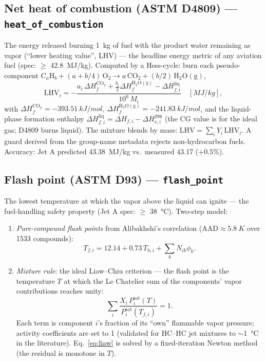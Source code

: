 \documentclass[11pt]{article}
\begin{document}
\subsection{Net heat of combustion (ASTM D4809) --- \texttt{heat\_of\_combustion}}
The energy released burning \SI{1}{kg} of fuel with the product water
remaining as vapor (``lower heating value'', LHV) --- the headline energy
metric of any aviation fuel (spec: $\ge$ \SI{42.8}{MJ/kg}). Computed by a
Hess-cycle: burn each pseudo-component
$\mathrm{C}_a\mathrm{H}_b + (a + b/4)\,\mathrm{O_2} \to a\,\mathrm{CO_2} + (b/2)\,\mathrm{H_2O(g)}$,
\begin{equation}
  \mathrm{LHV}_i = -\frac{ a_i\, \Delta H_f^{\mathrm{CO_2}}
   + \tfrac{b_i}{2} \Delta H_f^{\mathrm{H_2O(g)}}
   - \Delta H_{f,i}^{\mathrm{liq}} }{10^{6}\, M_i} \quad [\si{MJ/kg}],
\end{equation}
with $\Delta H_f^{\mathrm{CO_2}} = \SI{-393.51}{kJ/mol}$,
$\Delta H_f^{\mathrm{H_2O(g)}} = \SI{-241.83}{kJ/mol}$, and the liquid-phase
formation enthalpy
$\Delta H_{f,i}^{\mathrm{liq}} = \Delta H_{f,i} - \Delta H_{v,i}^{298}$
(the CG value is for the ideal gas; D4809 burns liquid). The mixture blends
by mass: $\mathrm{LHV} = \sum_i Y_i\, \mathrm{LHV}_i$. A guard derived from
the group-name metadata rejects non-hydrocarbon fuels. Accuracy: Jet A
predicted \SI{43.38}{MJ/kg} vs.\ measured \SI{43.17}{} ($+0.5\%$).

\subsection{Flash point (ASTM D93) --- \texttt{flash\_point}}
The lowest temperature at which the vapor above the liquid can ignite ---
the fuel-handling safety property (Jet A spec: $\ge$ \SI{38}{\celsius}).
Two-step model:
\begin{enumerate}
\item \emph{Pure-compound flash points} from Alibakhshi's correlation
  ($\mathrm{AAD}\approx\SI{5.8}{K}$ over 1533 compounds):
  \begin{equation}
    T_{f,i} = 12.14 + 0.73\,T_{\mathrm{b},i} + \textstyle\sum_k N_{ik}\phi_k .
  \end{equation}
\item \emph{Mixture rule}: the ideal Liaw--Chiu criterion --- the flash
  point is the temperature $T$ at which the Le Chatelier sum of the
  components' vapor contributions reaches unity:
  \begin{equation}
    \sum_i \frac{X_i\, P^{\mathrm{sat}}_i(T)}
                {P^{\mathrm{sat}}_i(T_{f,i})} = 1 .
    \label{eq:liaw}
  \end{equation}
  Each term is component $i$'s fraction of its ``own'' flammable vapor
  pressure; activity coefficients are set to 1 (validated for HC--HC jet
  mixtures to $\sim$\SI{1}{\celsius} in the literature).
  Eq.~\eqref{eq:liaw} is solved by a fixed-iteration Newton method (the
  residual is monotone in $T$).
\end{enumerate}
\end{document}
